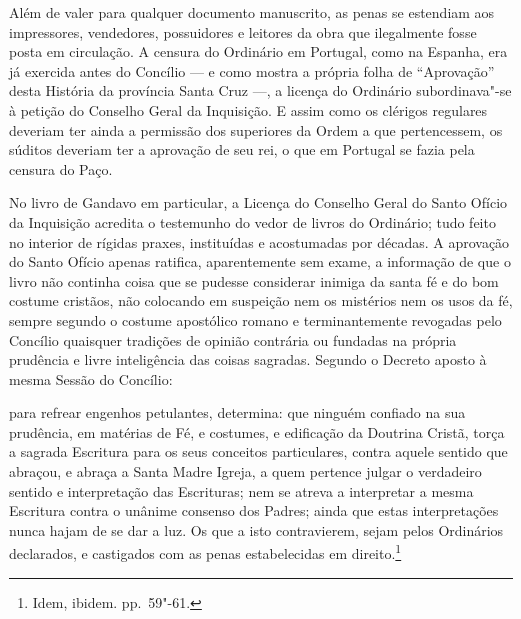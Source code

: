 Além de valer para qualquer documento manuscrito, as penas se estendiam
aos impressores, vendedores, possuidores e leitores da obra que
ilegalmente fosse posta em circulação. A censura do Ordinário em
Portugal, como na Espanha, era já exercida antes do Concílio --- e como
mostra a própria folha de ``Aprovação'' desta
História da província Santa Cruz ---, a licença do Ordinário
subordinava"-se à petição do Conselho Geral da Inquisição. E assim como
os clérigos regulares deveriam ter ainda a permissão dos superiores da
Ordem a que pertencessem, os súditos deveriam ter a aprovação de seu
rei, o que em Portugal se fazia pela censura do Paço.

No livro de Gandavo em particular, a Licença do Conselho Geral do Santo
Ofício da Inquisição acredita o testemunho do vedor de livros do
Ordinário; tudo feito no interior de rígidas praxes, instituídas e
acostumadas por décadas. A aprovação do Santo Ofício apenas ratifica,
aparentemente sem exame, a informação de que o livro não continha coisa
que se pudesse considerar inimiga da santa fé e do bom costume
cristãos, não colocando em suspeição nem os mistérios nem os usos da
fé, sempre segundo o costume apostólico romano e terminantemente
revogadas pelo Concílio quaisquer tradições de opinião contrária ou
fundadas na própria prudência e livre inteligência das coisas sagradas.
Segundo o Decreto aposto à mesma Sessão do Concílio:
\begin{hedraquote}
para refrear engenhos petulantes, determina: que ninguém confiado na sua
prudência, em matérias de Fé, e costumes, e edificação da Doutrina
Cristã, torça a sagrada Escritura para os seus conceitos particulares,
contra aquele sentido que abraçou, e abraça a Santa Madre Igreja, a
quem pertence julgar o verdadeiro sentido e interpretação das
Escrituras; nem se atreva a interpretar a mesma Escritura contra o
unânime consenso dos Padres; ainda que estas interpretações nunca hajam
de se dar a luz. Os que a isto contravierem, sejam pelos Ordinários
declarados, e castigados com as penas estabelecidas em
direito.\footnote{ Idem, ibidem. pp.~59"-61.}
\end{hedraquote}

